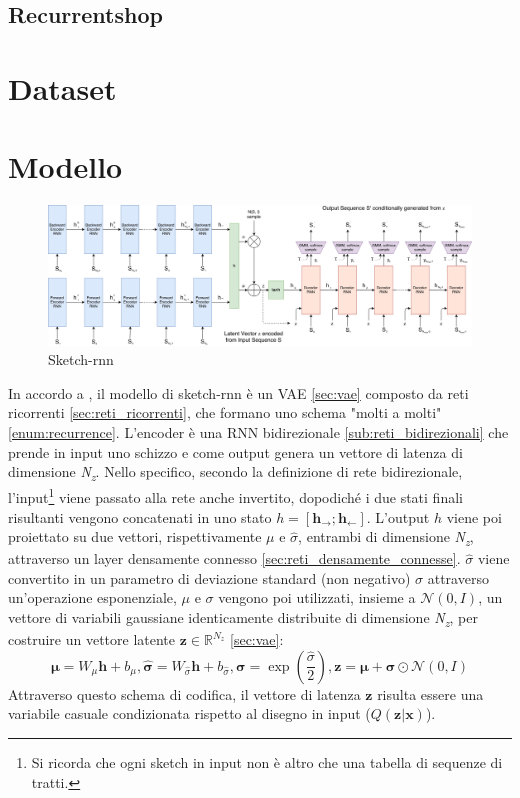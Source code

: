 \subsection{Recurrentshop}
\section{Dataset}
\section{Modello} %
\label{sec:modello}
\begin{figure}[ht]
	\centering
	\includegraphics[width=\linewidth]{img/sketch_model.png}
	\caption{Sketch-rnn}
	\label{fig:1.15}
\end{figure}

In accordo a \cite{sketchrnn}, il modello di sketch-rnn è un VAE \ref{sec:vae} composto da reti ricorrenti \ref{sec:reti_ricorrenti}, che formano uno schema "molti a molti" \ref{enum:recurrence}. L'encoder è una RNN bidirezionale \ref{sub:reti_bidirezionali} che prende in input uno schizzo e come output genera un vettore di latenza di dimensione \textit{N\textsubscript{z}}. Nello specifico, secondo la definizione di rete bidirezionale, l'input\footnote{Si ricorda che ogni sketch in input non è altro che una tabella di sequenze di tratti.} viene passato alla rete anche invertito, dopodiché i due stati finali risultanti vengono concatenati in uno stato $h = [\boldsymbol{h_\rightarrow} ; \boldsymbol{h_\leftarrow}]$. L'output $h$ viene poi proiettato su due vettori, rispettivamente $\mu$ e $\hat\sigma$, entrambi di dimensione \textit{N\textsubscript{z}}, attraverso un layer densamente connesso \ref{sec:reti_densamente_connesse}. $\hat\sigma$ viene convertito in un parametro di deviazione standard (non negativo) $\sigma$ attraverso un'operazione esponenziale, $\mu$ e $\sigma$ vengono poi utilizzati, insieme a $\mathcal{N}(0, I)$, un vettore di variabili gaussiane identicamente distribuite di dimensione \textit{N\textsubscript{z}}, per costruire un vettore latente $\boldsymbol{z} \in \mathbb{R}^{N_z}$ \ref{sec:vae}:
\begin{equation}
	\label{repar_trick}
	\boldsymbol{\mu} = W_\mu \boldsymbol{h} + b_\mu, \boldsymbol{\hat\sigma} = W_{\hat\sigma} \boldsymbol{h} + b_{\hat\sigma}, \boldsymbol{\sigma} = \exp (\frac{\hat\sigma}{2}), \boldsymbol{z} = \boldsymbol{\mu} + \boldsymbol{\sigma} \odot \mathcal{N}(0, I)
\end{equation}
Attraverso questo schema di codifica, il vettore di latenza $\boldsymbol{z}$ risulta essere una variabile casuale condizionata rispetto al disegno in input ($Q(\boldsymbol{z} | \boldsymbol{x})$).

